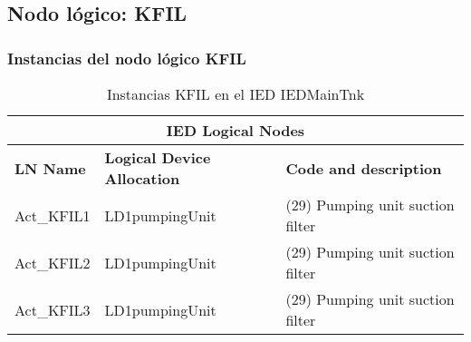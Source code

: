 
\subsection{Nodo l\'ogico: 			 KFIL}

    \subsubsection{Instancias del nodo l\'ogico KFIL}
    \begin{table}[H]
    \begin{center}
    \begin{tabular}{|l|l|p{6.8cm}|}
            \hline
            \multicolumn{3}{|c|}{\cellcolor[gray]{0.8} \textbf{IED Logical Nodes} } \\
            \hline
            \textbf{LN Name} & \textbf{Logical Device Allocation} & \textbf{Code and description} \\
            \hline
            Act\_KFIL1 & LD1pumpingUnit & (29) Pumping unit suction filter \\
            \hline
            Act\_KFIL2 & LD1pumpingUnit & (29) Pumping unit suction filter \\
            \hline
            Act\_KFIL3 & LD1pumpingUnit & (29) Pumping unit suction filter \\
            \hline
    \end{tabular}
    \caption{Instancias KFIL en el IED IEDMainTnk}
    \label{table:lnInstKFIL_29}
    \end{center}
    \end{table}
    
    
    
